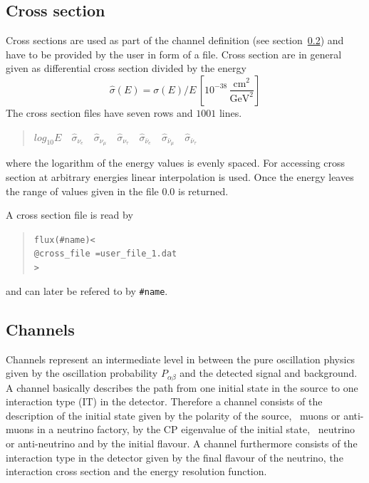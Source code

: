 \subsection{Cross section}
\label{sec:cross_section}

Cross sections are used as part of the 
channel definition 
(see section~\ref{sec:channel}) and have to be provided by the user in form
of a file. Cross section are in general given as differential cross section
divided by the energy
\begin{equation}
\hat\sigma(E)=\sigma(E)/E\,\left[ 10^{-38}\,
\frac{\mathrm{cm}^2}{\mathrm{GeV}^2} \right]
\end{equation}
The cross section files have seven rows and $1001$ lines.
\begin{quotation}
$log_{10} E\quad
\hat\sigma_{\nu_e}\quad
\hat\sigma_{\nu_\mu}\quad
\hat\sigma_{\nu_\tau}\quad
\hat\sigma_{\bar\nu_e}\quad
\hat\sigma_{\bar\nu_\mu}\quad
\hat\sigma_{\bar\nu_\tau}$
\end{quotation}
where the logarithm of the energy values is evenly spaced. 
For accessing cross section at 
arbitrary energies linear interpolation is used. Once the energy leaves the
range of values given in the file $0.0$ is returned.

A cross section file is read by 
\begin{quote}
{\tt flux(\#name)<}\\
{\tt \tb @cross\_file =user\_file\_1.dat}\\
{\tt >}
\end{quote}  
and can later be refered to by {\tt \#name}.


\subsection{Channels}
\label{sec:channel}

Channels represent an intermediate level in between 
the pure oscillation 
physics given by the oscillation probability $P_{\alpha\beta}$ and the
detected signal and background. A channel basically describes the path from one
initial state in the source to one interaction type (IT) in  the detector.  
Therefore a channel consists of the description of the initial state given 
by the polarity 
of the source, \eg\ muons or anti-muons in a neutrino factory, by the CP 
eigenvalue of the initial state, \ie\ neutrino or anti-neutrino and by the 
initial flavour. A channel furthermore consists of the interaction type in the
detector given by the final flavour of the neutrino, the interaction cross
section and the energy resolution function. 
 
